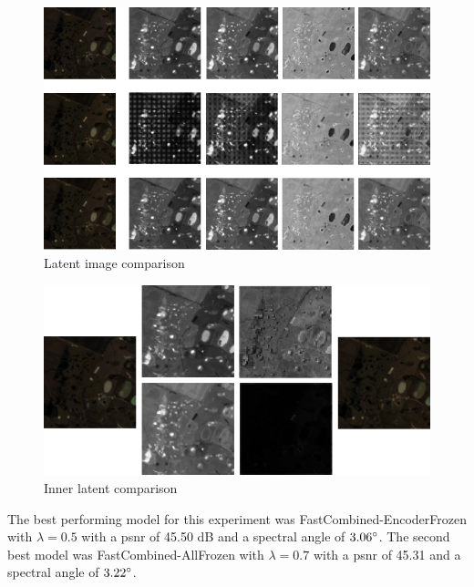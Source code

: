\begin{figure}
\centering
\includegraphics[scale=0.65]{img/latents.png}
\caption{Latent image comparison}
\label{fig:latentcompare}
\end{figure}

\begin{figure}
\centering
\includegraphics[scale=0.85]{img/innerlatent.png}
\caption{Inner latent comparison}
\label{fig:innerlatent}
\end{figure}

The best performing model for this experiment was FastCombined-EncoderFrozen with $\lambda=0.5$ with a \ac{psnr} of 45.50 dB and a spectral angle of $3.06 \degree$. The second best model was FastCombined-AllFrozen with $\lambda=0.7$ with a \ac{psnr} of 45.31 and a spectral angle of $3.22 \degree$.

